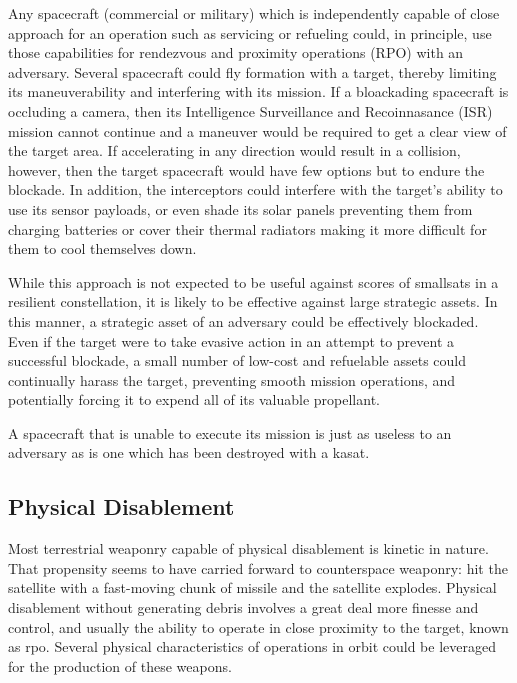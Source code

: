 Any spacecraft (commercial or military) which is independently capable
of close approach for an operation such as servicing or refueling
could, in principle, use those capabilities for rendezvous and
proximity operations (RPO) with an adversary.  Several spacecraft
could fly formation with a target, thereby limiting its
maneuverability and interfering with its mission.  If a bloackading
spacecraft is occluding a camera, then its Intelligence Surveillance
and Recoinnasance (ISR) mission cannot continue and a maneuver would
be required to get a clear view of the target area.  If accelerating
in any direction would result in a collision, however, then the target
spacecraft would have few options but to endure the blockade.  In
addition, the interceptors could interfere with the target's ability
to use its sensor payloads, or even shade its solar panels preventing
them from charging batteries or cover their thermal radiators making
it more difficult for them to cool themselves down.

While this approach is not expected to be useful against scores of
smallsats in a resilient constellation, it is likely to be effective
against large strategic assets. In this manner, a strategic asset of
an adversary could be effectively blockaded.  Even if the target were
to take evasive action in an attempt to prevent a successful blockade,
a small number of low-cost and refuelable assets could continually
harass the target, preventing smooth mission operations, and
potentially forcing it to expend all of its valuable propellant.

A spacecraft that is unable to execute its mission is just as useless
to an adversary as is one which has been destroyed with a \ac{kasat}.

\subsection{Physical Disablement}
Most terrestrial weaponry capable of physical disablement is kinetic
in nature.  That propensity seems to have carried forward to
counterspace weaponry: hit the satellite with a fast-moving chunk of
missile and the satellite explodes.  Physical disablement without
generating debris involves a great deal more finesse and control, and
usually the ability to operate in close proximity to the target, known
as \acf{rpo}.  Several physical characteristics of operations in orbit
could be leveraged for the production of these weapons.

